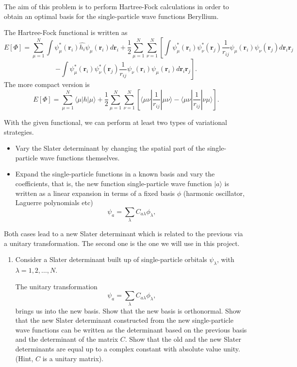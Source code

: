 \begin{prob}

The aim of this problem is to perform Hartree-Fock calculations in order to obtain
an optimal basis  for the single-particle wave functions Beryllium. 

The Hartree-Fock functional is written as 
\[
  E[\Phi] = \sum_{\mu=1}^N \int \psi_{\mu}^*(\mathbf{r}_i)\hat{h_i}\psi_{\mu}(\mathbf{r}_i) d\mathbf{r}_i 
  + \frac{1}{2}\sum_{\mu=1}^N\sum_{\nu=1}^N
   \left[ \int \psi_{\mu}^*(\mathbf{r}_i)\psi_{\nu}^*(\mathbf{r}_j)\frac{1} 
    {r_{ij}}\psi_{\mu}(\mathbf{r}_i)\psi_{\nu}(\mathbf{r}_j)
    d\mathbf{r}_i\mathbf{r}_j \right.
\]
\[ \left.
  - \int \psi_{\mu}^*(\mathbf{r}_i)\psi_{\nu}^*(\mathbf{r}_j)
  \frac{1}{r_{ij}}\psi_{\nu}(\mathbf{r}_i)\psi_{\mu}(\mathbf{r}_i)
  d\mathbf{r}_i\mathbf{r}_j\right].
\]
The more compact version is
\[
  E[\Phi] 
  = \sum_{\mu=1}^N \langle \mu | h | \mu\rangle+ \frac{1}{2}\sum_{\mu=1}^N\sum_{\nu=1}^N\left[\langle \mu\nu |\frac{1}{r_{ij}}|\mu\nu\rangle-\langle \mu\nu |\frac{1}{r_{ij}}|\nu\mu\rangle\right].
\]

With the given functional, we can perform at least two types of variational strategies.
\begin{itemize}
\item Vary the Slater determinant by changing the spatial part of the single-particle
wave functions themselves. 
\item   Expand the single-particle functions in a known basis  and vary the coefficients, 
that is, the new function single-particle wave function $|a\rangle$ is written as a linear expansion
in terms of a fixed basis $\phi$ (harmonic oscillator, Laguerre polynomials etc)
\[
\psi_a  = \sum_{\lambda} C_{a\lambda}\phi_{\lambda},
\]
 \end{itemize}
Both cases lead to a new Slater determinant which is related to the previous via  a unitary transformation.
The second one is the one we will use in this project.

\begin{enumerate}
\item Consider a Slater determinant built up of single-particle orbitals $\psi_{\lambda}$, 
with $\lambda = 1,2,\dots,N$.

The unitary transformation
\[
\psi_a  = \sum_{\lambda} C_{a\lambda}\phi_{\lambda},
\]
brings us into the new basis.  Show that the new basis is orthonormal.
Show that the new Slater determinant constructed from the new single-particle wave functions can be
written as the determinant based on the previous basis and the determinant of the matrix $C$.
Show that the old and the new Slater determinants are equal up to a complex constant with absolute value unity.
(Hint, $C$ is a unitary matrix). 



\end{enumerate}
\end{prob}

